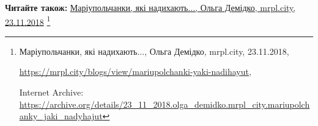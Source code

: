  
 
 
 
 

\textbf{Читайте також:} \href{https://archive.org/details/23_11_2018.olga_demidko.mrpl_city.mariupolchanky_jaki_nadyhajut}{%
Маріупольчанки, які надихають..., Ольга Демідко, mrpl.city, 23.11.2018}%
\footnote{Маріупольчанки, які надихають..., Ольга Демідко, mrpl.city, 23.11.2018, \par\url{https://mrpl.city/blogs/view/mariupolchanki-yaki-nadihayut}, \par Internet Archive: \url{https://archive.org/details/23_11_2018.olga_demidko.mrpl_city.mariupolchanky_jaki_nadyhajut}}
